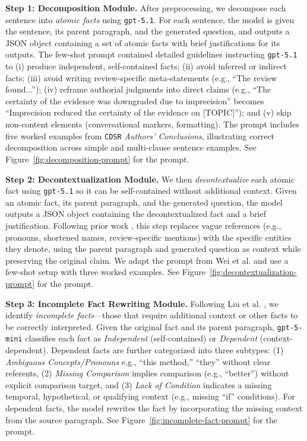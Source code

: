 \documentclass{article}
\newcommand{\xhdr}[1]{%
  \noindent\textbf{#1.}
}
\begin{document}
\xhdr{Step 1: Decomposition Module} After preprocessing, we decompose each sentence into \textit{atomic facts} using \texttt{gpt-5.1}. For each sentence, the model is given the sentence, its parent paragraph, and the generated question, and outputs a JSON object containing a set of atomic facts with brief justifications for its outputs. The few-shot prompt contained detailed guidelines instructing \texttt{gpt-5.1} to (i) produce independent, self-contained facts; (ii) avoid inferred or indirect facts; (iii) avoid writing review-specific meta-statements (e.g., ``The review found...''); (iv) reframe authorial judgments into direct claims (e.g., ``The certainty of the evidence was downgraded due to imprecision'' becomes ``Imprecision reduced the certainty of the evidence on [TOPIC]''); and (v) skip non-content elements (conversational markers, formatting). The prompt includes five worked examples from \texttt{CDSR} \textit{Authors’ Conclusions}, illustrating correct decomposition across simple and multi-clause sentence examples. See Figure~\ref{fig:decomposition-prompt} for the prompt.

\xhdr{Step 2: Decontextualization Module} We then \textit{decontextualize} each atomic fact using \texttt{gpt-5.1} so it can be self-contained without additional context. Given an atomic fact, its parent paragraph, and the generated question, the model outputs a JSON object containing the decontextualized fact and a brief justification. Following prior work \cite{liu-etal-2025-verifact, 10.5555/3737916.3740483}, this step replaces vague references (e.g., pronouns, shortened names, review-specific mentions) with the specific entities they denote, using the parent paragraph and generated question as context while preserving the original claim. We adapt the prompt from Wei et al. \cite{10.5555/3737916.3740483} and use a few-shot setup with three worked examples. See Figure~\ref{fig:decontextualization-prompt} for the prompt.


\xhdr{Step 3: Incomplete Fact Rewriting Module} Following Liu et al. \cite{liu-etal-2025-verifact}, we identify \textit{incomplete facts}---those that require additional context or other facts to be correctly interpreted. %
Given the original fact and its parent paragraph, \texttt{gpt-5-mini} classifies each fact as \textit{Independent} (self-contained) or \textit{Dependent} (context-dependent). Dependent facts are further categorized into three subtypes: (1) \textit{Ambiguous Concepts/Pronouns} e.g., ``this method,” “they” without clear referents, (2) \textit{Missing Comparison} implies comparison (e.g., ``better'') without explicit comparison target, and (3) \textit{Lack of Condition} indicates a missing temporal, hypothetical, or qualifying context (e.g., missing ``if'' conditions). For dependent facts, the model rewrites the fact by incorporating the missing context from the source paragraph. See Figure~\ref{fig:incomplete-fact-prompt} for the prompt.
\end{document}
